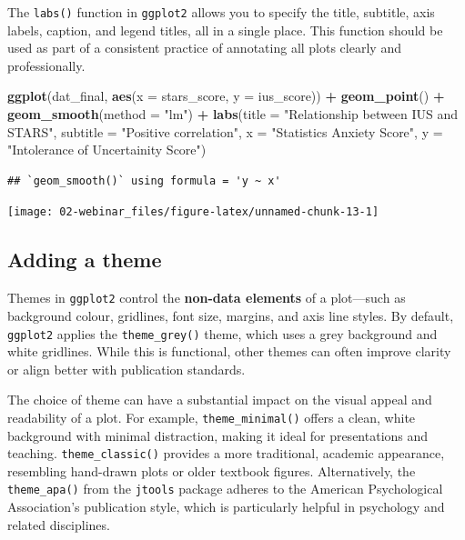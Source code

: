\documentclass[
  oneside]{book}
\newenvironment{Shaded}{\begin{snugshade}}{\end{snugshade}}
\newcommand{\AttributeTok}[1]{\textcolor[rgb]{0.13,0.29,0.53}{#1}}
\newcommand{\FunctionTok}[1]{\textcolor[rgb]{0.13,0.29,0.53}{\textbf{#1}}}
\newcommand{\NormalTok}[1]{#1}
\newcommand{\SpecialCharTok}[1]{\textcolor[rgb]{0.81,0.36,0.00}{\textbf{#1}}}
\newcommand{\StringTok}[1]{\textcolor[rgb]{0.31,0.60,0.02}{#1}}
\begin{document}
The \texttt{labs()} function in \texttt{ggplot2} allows you to specify the title, subtitle, axis labels, caption, and legend titles, all in a single place. This function should be used as part of a consistent practice of annotating all plots clearly and professionally.

\begin{Shaded}
\begin{Highlighting}[]
\FunctionTok{ggplot}\NormalTok{(dat\_final, }\FunctionTok{aes}\NormalTok{(}\AttributeTok{x =}\NormalTok{ stars\_score, }\AttributeTok{y =}\NormalTok{ ius\_score)) }\SpecialCharTok{+}
  \FunctionTok{geom\_point}\NormalTok{() }\SpecialCharTok{+}
  \FunctionTok{geom\_smooth}\NormalTok{(}\AttributeTok{method =} \StringTok{"lm"}\NormalTok{) }\SpecialCharTok{+}
  \FunctionTok{labs}\NormalTok{(}\AttributeTok{title =} \StringTok{"Relationship between IUS and STARS"}\NormalTok{,}
       \AttributeTok{subtitle =} \StringTok{"Positive correlation"}\NormalTok{,}
       \AttributeTok{x =} \StringTok{"Statistics Anxiety Score"}\NormalTok{,}
       \AttributeTok{y =} \StringTok{"Intolerance of Uncertainity Score"}\NormalTok{)}
\end{Highlighting}
\end{Shaded}

\begin{verbatim}
## `geom_smooth()` using formula = 'y ~ x'
\end{verbatim}

\begin{center}\texttt{[image: 02-webinar\_files/figure-latex/unnamed-chunk-13-1]} \end{center}

\subsection{Adding a theme}\label{adding-a-theme}

Themes in \texttt{ggplot2} control the \textbf{non-data elements} of a plot---such as background colour, gridlines, font size, margins, and axis line styles. By default, \texttt{ggplot2} applies the \texttt{theme\_grey()} theme, which uses a grey background and white gridlines. While this is functional, other themes can often improve clarity or align better with publication standards.

The choice of theme can have a substantial impact on the visual appeal and readability of a plot. For example, \texttt{theme\_minimal()} offers a clean, white background with minimal distraction, making it ideal for presentations and teaching. \texttt{theme\_classic()} provides a more traditional, academic appearance, resembling hand-drawn plots or older textbook figures. Alternatively, the \texttt{theme\_apa()} from the \texttt{jtools} package adheres to the American Psychological Association's publication style, which is particularly helpful in psychology and related disciplines.
\end{document}
